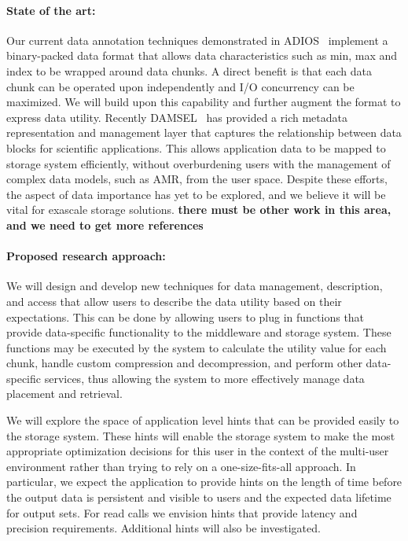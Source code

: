 \paragraph{State of the art:}
Our current data annotation techniques demonstrated in
ADIOS~\cite{lofstead:2009:adaptible} implement a binary-packed data format that
allows data characteristics such as min, max and index to be wrapped around
data chunks. A direct benefit is that each data chunk can be operated upon
independently and I/O concurrency can be maximized. We will build upon this
capability and further augment the format to express data utility.
Recently
DAMSEL~\cite{damsel} has provided a rich metadata representation and management
layer that captures the relationship between data blocks for scientific
applications.  This allows application data to be mapped to storage system
efficiently, without overburdening users with the management of complex data models, such
as AMR, from the user space. Despite these efforts, the aspect of data importance has yet to be 
explored, and we believe it will be vital for exascale storage solutions.
{\color{red}\bf there must be other work in this area, and we need to get more
references}

\paragraph{Proposed research approach:} 
We will design and develop new techniques for data management, description,
and access that allow users to describe the data utility based on their
expectations. This can be done by allowing users to plug in functions that
provide data-specific functionality to the middleware and storage system.
These functions may be executed by the system to
calculate the utility value for each chunk, handle custom compression
and decompression, and perform other data-specific services, thus allowing
the system to more effectively manage data placement and retrieval.
%

We will explore the space of application level hints that can be provided easily
to the storage system. These hints will enable the storage system to make the
most appropriate optimization decisions for this user in the context of the
multi-user environment rather than trying to rely on a one-size-fits-all
approach. In particular, we expect the application to provide hints on the
length of time before the output data is persistent and visible to users and
the expected data lifetime for output sets. For read calls we envision
hints that provide latency and precision requirements. Additional hints will
also be investigated. 

